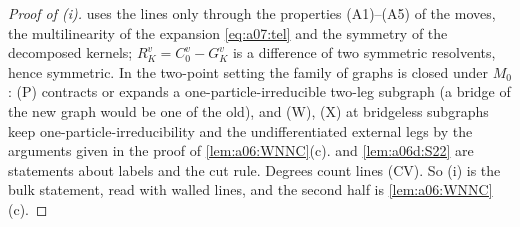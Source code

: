 \begin{proof}[Proof of \textup{(i)}]
 uses the lines only through the properties (A1)--(A5) of the moves, the multilinearity of the expansion \eqref{eq:a07:tel} and the symmetry of the decomposed kernels; $R^v_K=C^v_0-G^v_K$ is a difference of two symmetric resolvents, hence symmetric. In the two-point setting the family of \cite[(1.23)]{Ba3} graphs is closed under $M_0$: (P) contracts or expands a one-particle-irreducible two-leg subgraph (a bridge of the new graph would be one of the old), and (W), (X) at bridgeless subgraphs keep one-particle-irreducibility and the undifferentiated external legs by the arguments given in the proof of \cref{lem:a06:WNNC}(c).  and \cref{lem:a06d:S22} are statements about labels and the cut rule. Degrees count lines (CV). So (i) is the bulk statement, read with walled lines, and the second half is \cref{lem:a06:WNNC}(c).
\end{proof}
